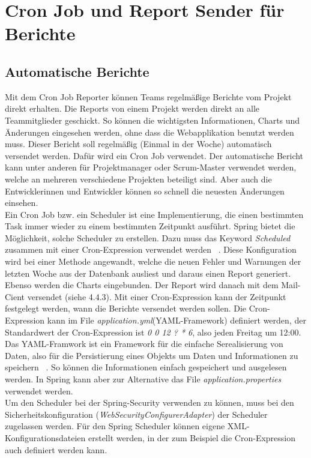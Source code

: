 \section{Cron Job und Report Sender für Berichte}
\subsection{Automatische Berichte} 
Mit dem Cron Job Reporter können Teams regelmäßige Berichte vom Projekt direkt erhalten. Die Reports von einem Projekt werden direkt an alle Teammitglieder geschickt. So können die wichtigsten Informationen, Charts und Änderungen eingesehen werden, ohne dass die Webapplikation benutzt werden muss. Dieser Bericht soll regelmäßig (Einmal in der Woche) automatisch versendet werden. Dafür wird ein Cron Job verwendet. Der automatische Bericht kann unter anderen für Projektmanager oder Scrum-Master verwendet werden, welche an mehreren verschiedene Projekten beteiligt sind. Aber auch die Entwicklerinnen und Entwickler können so schnell die neuesten Änderungen einsehen. \\ Ein Cron Job bzw. ein Scheduler ist eine Implementierung, die einen bestimmten Task immer wieder zu einem bestimmten Zeitpunkt ausführt. Spring bietet die Möglichkeit, solche Scheduler zu erstellen. Dazu muss das Keyword \textit{Scheduled} zusammen mit einer Cron-Expression verwendet werden ~\parencite{cintirScheduler}. Diese Konfiguration wird bei einer Methode angewandt, welche die neuen Fehler und Warnungen der letzten Woche aus der Datenbank ausliest und daraus einen Report generiert. Ebenso werden die Charts eingebunden. Der Report wird danach mit dem Mail-Cient versendet (siehe 4.4.3). Mit einer Cron-Expression kann der Zeitpunkt festgelegt werden, wann die Berichte versendet werden sollen. Die Cron-Expression kann im File \textit{application.yml}(YAML-Framework) definiert werden, der Standardwert der Cron-Expression ist \textit{0 0 12 ? * 6}, also jeden Freitag um 12:00. Das YAML-Framwork ist ein Framework für die einfache Serealisierung von Daten, also für die Persistierung eines Objekts um Daten und Informationen zu speichern ~\parencite{eriksson2011comparison}. So können die Informationen einfach gespeichert und ausgelesen werden. In Spring kann aber zur Alternative das File \textit{application.properties} verwendet werden. \\ Um den Scheduler bei der Spring-Security verwenden zu können, muss bei den Sicherheitskonfiguration (\textit{WebSecurityConfigurerAdapter}) der Scheduler zugelassen werden. Für den Spring Scheduler können eigene XML-Konfigurationsdateien erstellt werden, in der zum Beispiel die Cron-Expression auch definiert werden kann.
